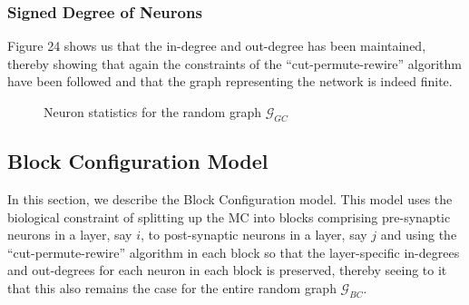 \subsubsection{Signed Degree of Neurons}
Figure 24 shows us that the in-degree and out-degree has been maintained, thereby showing that again the constraints of the  ``cut-permute-rewire'' \cite{WattsStrogatz1998} algorithm have been followed and that the graph representing the network is indeed finite.
\begin{figure}[H]%
    \centering
    \captionsetup{justification=centering}
    \qquad
    \caption{Neuron statistics for the random graph $\mathcal{G}_{GC}$}%
    \label{fig:example}%
\end{figure}


 
\newpage
\subsection{Block Configuration Model}
In this section, we describe the Block Configuration model. This model uses the biological constraint of splitting up the MC into blocks comprising pre-synaptic neurons in a layer, say $i$, to post-synaptic neurons in a layer, say $j$ and using the ``cut-permute-rewire'' \cite{WattsStrogatz1998} algorithm in each block so that the layer-specific in-degrees and out-degrees for each neuron in each block is preserved, thereby seeing to it that this also remains the case for the entire random graph $\mathcal{G}_{BC}$.

